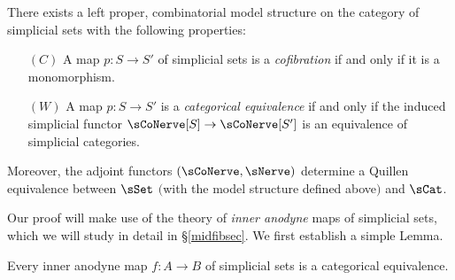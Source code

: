 \begin{theorem}\label{biggier}
There exists a left proper, combinatorial model structure on
the category of simplicial sets with the following properties:
\begin{itemize}
\item[$(C)$] A map $p: S \rightarrow S'$ of simplicial sets is a {\it
cofibration} if and only if it is a monomorphism.

\item[$(W)$] A map $p: S \rightarrow S'$ is a {\it categorical
equivalence} if and only if the induced simplicial functor
$\sCoNerve[S] \rightarrow \sCoNerve[S']$ is an equivalence of simplicial categories.
\end{itemize}

Moreover, the adjoint functors $(\sCoNerve, \sNerve)$
determine a Quillen equivalence between $\sSet$ $($with the model structure defined above$)$ and $\sCat$.
\end{theorem}

Our proof will make use of the theory of {\em inner anodyne} maps of simplicial sets,
which we will study in detail in \S \ref{midfibsec}. We first establish a simple Lemma.

\begin{lemma}\label{rugg}
Every inner anodyne map $f: A \rightarrow B$ of simplicial sets is a categorical equivalence.
\end{lemma}

